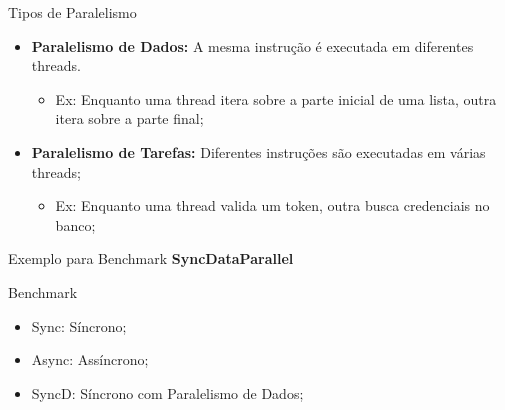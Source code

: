 \documentclass[10pt]{beamer}
\begin{document}
\begin{frame}{Tipos de Paralelismo}
	\begin{itemize}
		\item \textbf{Paralelismo de Dados:} A mesma instrução é executada em diferentes threads.
		\begin{itemize}
			\item Ex: Enquanto uma thread itera sobre a parte inicial de uma lista, outra itera sobre a parte final; 
		\end{itemize}
		\vspace{0.2cm}
		\item \textbf{Paralelismo de Tarefas:} Diferentes instruções são executadas em várias threads;
		\begin{itemize}
			\item Ex: Enquanto uma thread valida um token, outra busca credenciais no banco;
		\end{itemize}
	\end{itemize}
\end{frame}


\begin{frame}{Exemplo para Benchmark}
	\textbf{SyncDataParallel}
\end{frame}

\begin{frame}{Benchmark}
	\begin{figure}
	\end{figure}
	\vspace{-0.5cm}
	\scriptsize
	\begin{itemize}
		\item Sync: Síncrono;
		\item Async: Assíncrono;
		\item SyncD: Síncrono com Paralelismo de Dados;
	\end{itemize}
\end{frame}
\end{document}
